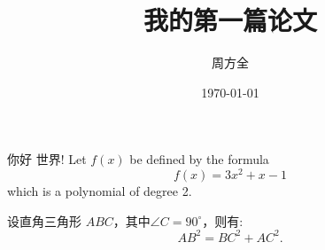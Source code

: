 \documentclass{ctexart} %
\title{\heiti 我的第一篇论文}
\author{\kaishu 周方全}
\date{\today}
\newcommand\degree{^\circ}
\begin{document}
	\maketitle
	
	你好 世界!
	Let $f(x)$ be defined by the formula 
	$$f(x) = 3x^2+x-1$$ which is a polynomial of degree 2.
	
	设直角三角形 $ABC$，其中$\angle C = 90\degree$，则有:
	\begin{equation}
	AB^2 = BC^2 + AC^2.
	\end{equation}
\end{document}
